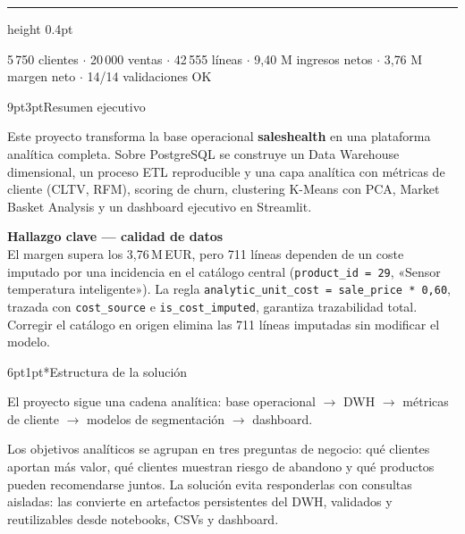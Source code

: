 \documentclass[10pt,a4paper]{article}
\makeatletter
\renewcommand\section{\@startsection{section}{1}{0pt}
  {9pt}{3pt}{\large\bfseries\color{accent}}}
\renewcommand\subsection{\@startsection{subsection}{2}{0pt}
  {6pt}{1pt}{\normalsize\bfseries\color{ink}}}
\newenvironment{mdframed}[1][]{
  \par\vspace{3pt}\noindent
  \begin{lrbox}{\calloutbox}
  \begin{minipage}{0.94\textwidth}
}{
  \end{minipage}
  \end{lrbox}
  \begingroup
  \setlength{\fboxsep}{8pt}
  \colorbox{calloutbg}{\usebox{\calloutbox}}
  \endgroup
  \par\vspace{3pt}
}
\makeatother
\begin{document}
\vspace{1.1cm}
{\color{rulecol}\hrule height 0.4pt}
\vspace{0.35cm}

{\small\color{mutedgray}
5\,750 clientes $\cdot$ 20\,000 ventas $\cdot$ 42\,555 líneas $\cdot$
9{,}40 M ingresos netos $\cdot$ 3{,}76 M margen neto $\cdot$ 14/14 validaciones OK}

\newpage
\pagecolor{white}\color{ink}

\section{Resumen ejecutivo}

Este proyecto transforma la base operacional \textbf{saleshealth} en una
plataforma analítica completa. Sobre PostgreSQL se construye un Data Warehouse
dimensional, un proceso ETL reproducible y una capa analítica con métricas de
cliente (CLTV, RFM), scoring de churn, clustering K-Means con PCA, Market
Basket Analysis y un dashboard ejecutivo en Streamlit.

\begin{mdframed}[style=cbox]
\textbf{\color{accent}Hallazgo clave --- calidad de datos}\\[2pt]
El margen supera los 3,76\,M\,EUR, pero 711 líneas dependen de un coste imputado
por una incidencia en el catálogo central (\texttt{product\_id = 29}, «Sensor
temperatura inteligente»). La regla
\texttt{analytic\_unit\_cost = sale\_price * 0{,}60}, trazada con
\texttt{cost\_source} e \texttt{is\_cost\_imputed}, garantiza trazabilidad
total. Corregir el catálogo en origen elimina las 711 líneas imputadas sin
modificar el modelo.
\end{mdframed}

\subsection*{Estructura de la solución}

El proyecto sigue una cadena analítica: base operacional $\to$ DWH $\to$
métricas de cliente $\to$ modelos de segmentación $\to$ dashboard.

\vspace{3pt}
Los objetivos analíticos se agrupan en tres preguntas de negocio: qué clientes
aportan más valor, qué clientes muestran riesgo de abandono y qué productos
pueden recomendarse juntos. La solución evita responderlas con consultas
aisladas: las convierte en artefactos persistentes del DWH, validados y
reutilizables desde notebooks, CSVs y dashboard.
\end{document}
